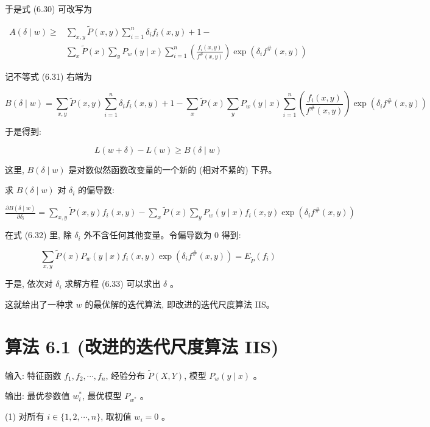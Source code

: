 \documentclass[10pt]{article}
\begin{document}
\begin{CJK*}{UTF8}{bsmi}
于是式 (6.30) 可改写为


\begin{align*}
A(\delta \mid w) \geqslant & \sum_{x, y} \tilde{P}(x, y) \sum_{i=1}^{n} \delta_{i} f_{i}(x, y)+1- \\
& \sum_{x} \tilde{P}(x) \sum_{y} P_{w}(y \mid x) \sum_{i=1}^{n}\left(\frac{f_{i}(x, y)}{f^{\#}(x, y)}\right) \exp \left(\delta_{i} f^{\#}(x, y)\right) \tag{6.31}
\end{align*}


记不等式 (6.31) 右端为

$$
B(\delta \mid w)=\sum_{x, y} \tilde{P}(x, y) \sum_{i=1}^{n} \delta_{i} f_{i}(x, y)+1-\sum_{x} \tilde{P}(x) \sum_{y} P_{w}(y \mid x) \sum_{i=1}^{n}\left(\frac{f_{i}(x, y)}{f^{\#}(x, y)}\right) \exp \left(\delta_{i} f^{\#}(x, y)\right)
$$

于是得到:

$$
L(w+\delta)-L(w) \geqslant B(\delta \mid w)
$$

这里, $B(\delta \mid w)$ 是对数似然函数改变量的一个新的 (相对不紧的) 下界。

求 $B(\delta \mid w)$ 对 $\delta_{i}$ 的偏导数:

$\frac{\partial B(\delta \mid w)}{\partial \delta_{i}}=\sum_{x, y} \tilde{P}(x, y) f_{i}(x, y)-\sum_{x} \tilde{P}(x) \sum_{y} P_{w}(y \mid x) f_{i}(x, y) \exp \left(\delta_{i} f^{\#}(x, y)\right)$

在式 (6.32) 里, 除 $\delta_{i}$ 外不含任何其他变量。令偏导数为 0 得到:


\begin{equation*}
\sum_{x, y} \tilde{P}(x) P_{w}(y \mid x) f_{i}(x, y) \exp \left(\delta_{i} f^{\#}(x, y)\right)=E_{\tilde{P}}\left(f_{i}\right) \tag{6.33}
\end{equation*}


于是, 依次对 $\delta_{i}$ 求解方程 (6.33) 可以求出 $\delta$ 。

这就给出了一种求 $w$ 的最优解的迭代算法, 即改进的迭代尺度算法 IIS。

\section*{算法 6.1 (改进的迭代尺度算法 IIS)}
输入: 特征函数 $f_{1}, f_{2}, \cdots, f_{n}$, 经验分布 $\tilde{P}(X, Y)$, 模型 $P_{w}(y \mid x)$ 。

输出: 最优参数值 $w_{i}^{*}$, 最优模型 $P_{w^{*}}$ 。

(1) 对所有 $i \in\{1,2, \cdots, n\}$, 取初值 $w_{i}=0$ 。


\end{CJK*}
\end{document}
